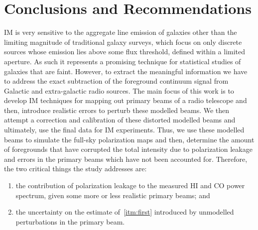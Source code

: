 \chapter{Conclusions and Recommendations} %

\label{Chapter7} %

IM is very sensitive to the aggregate line emission of galaxies other than the limiting magnitude of traditional galaxy surveys,
which focus on only discrete sources whose emission lies above some flux threshold, defined within a limited aperture. 
As such it represents a promising technique for statistical studies of galaxies that are faint. However, to extract the meaningful information we have
to address the exact subtraction of the foreground continuum signal from Galactic and extra-galactic radio sources.
The main focus of this work is to develop IM techniques for mapping out primary beams of a radio telescope and then, introduce realistic errors to perturb these modelled beams.
We then attempt a correction and calibration of these distorted modelled beams and ultimately, use the final data for IM experiments. Thus, we use
these modelled beams to simulate  the full-sky polarization maps and then, determine the amount of foregrounds that have corrupted the total intensity due to 
polarization leakage and errors in the primary beams which have not been accounted for. Therefore, the two critical things the study addresses are: 
\begin{enumerate}[label=(\roman*)]
 \item the contribution of polarization leakage to the measured HI and CO power spectrum, given some more or less realistic primary beams; and \label{itm:first}
 \item the uncertainty on the estimate of~\ref{itm:first} introduced by unmodelled perturbations in the primary beam.
\end{enumerate}

